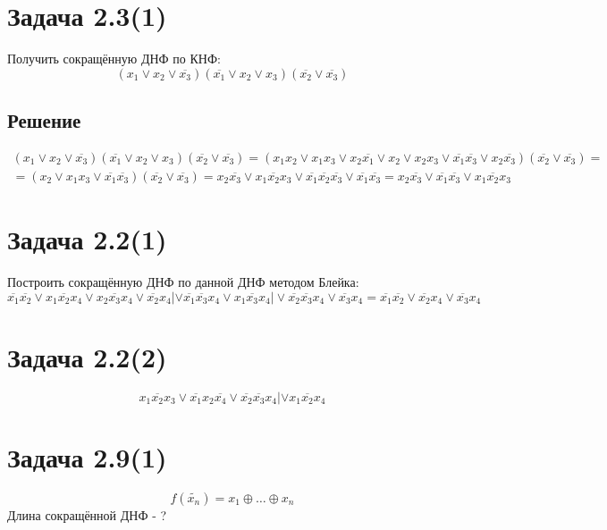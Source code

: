 \documentclass[11pt]{article}
\begin{document}
\section{Задача 2.3(1)}
\label{sec:org92f7df4}
Получить сокращённую ДНФ по КНФ:
\begin{equation}
(x_1\vee x_2\vee\overline{x_3})(\overline{x_1}\vee x_2\vee x_3)(\overline{x_2}\vee\overline{x_3})
\end{equation}
\subsection{Решение}
\label{sec:org73bf76f}
\begin{multline}
   (x_1\vee x_2\vee\overline{x_3})(\overline{x_1}\vee x_2\vee x_3)(\overline{x_2}\vee\overline{x_3})
= (x_1x_2\vee x_1x_3 \vee x_2\overline{x_1}\vee x_2\vee x_2x_3\vee\overline{x_1}\overline{x_3}
\vee x_2\overline{x_3})(\overline{x_2}\vee\overline{x_3}) = \\
= (x_2\vee x_1x_3\vee\overline{x_1}\overline{x_3})(\overline{x_2}\vee\overline{x_3})
= x_2\overline{x_3}\vee x_1\overline{x_2}x_3\vee\overline{x_1}\overline{x_2}\overline{x_3}
\vee\overline{x_1}\overline{x_3} = x_2\overline{x_3}\vee\overline{x_1}\overline{x_3}\vee x_1\overline{x_2}x_3
\end{multline}
\section{Задача 2.2(1)}
\label{sec:org0ab1b71}
Построить сокращённую ДНФ по данной ДНФ методом Блейка:
\begin{equation}
\overline{x_1}\overline{x_2}\vee x_1\overline{x_2}x_4\vee x_2\overline{x_3}x_4\vee\overline{x_2}x_4|
\vee\overline{x_1}\overline{x_3}x_4\vee x_1\overline{x_3}x_4|\vee\overline{x_2}\overline{x_3}x_4
\vee\overline{x_3}x_4 = \overline{x_1}\overline{x_2}\vee\overline{x_2}x_4\vee\overline{x_3}x_4
\end{equation}
\section{Задача 2.2(2)}
\label{sec:orgb59fd51}
  \begin{equation}
x_1\overline{x_2}x_3\vee\overline{x_1}x_2\overline{x_4}\vee\overline{x_2}\overline{x_3}x_4|
\vee x_1\overline{x_2}x_4
  \end{equation}
\section{Задача 2.9(1)}
\label{sec:org8d2a2ee}
  \begin{equation}
f(\tilde{x_n}) = x_1\oplus\ldots\oplus x_n
  \end{equation}
Длина сокращённой ДНФ - ?
\end{document}
